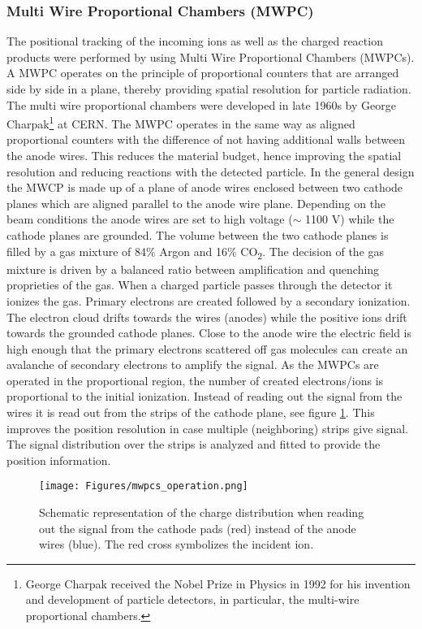 \subsubsection{Multi Wire Proportional Chambers (MWPC)}\label{sec_mwpcs}
The positional tracking of the incoming ions as well as the charged reaction products were performed by using Multi Wire Proportional Chambers (MWPCs). A MWPC operates on the principle of proportional counters that are arranged side by side in a plane, thereby providing spatial resolution for particle radiation. The multi wire proportional chambers were developed in late 1960s by George Charpak\footnote{George Charpak received the Nobel Prize in Physics in 1992 for his invention and development of particle detectors, in particular, the multi-wire proportional chambers.} at CERN\cite{charpak1968use}.\newline
The MWPC operates in the same way as aligned proportional counters with the difference of not having additional walls between the anode wires. This reduces the material budget, hence improving the spatial resolution and reducing reactions with the detected particle.\newline
In the general design the  MWCP is made up of a plane of anode wires enclosed between two cathode planes which are aligned parallel to the anode wire plane. Depending on the beam conditions the anode wires are set to high voltage ($\sim$ 1100 V) while the cathode planes are grounded.\newline
The volume between the two cathode planes is filled by a gas mixture of 84\% Argon and 16\% CO\textsubscript{2}. The decision of the gas mixture is driven by a balanced ratio between amplification and quenching proprieties of the gas.\newline
When a charged particle passes through the detector it ionizes the gas. Primary electrons are created followed by a secondary ionization. The electron cloud drifts towards the wires (anodes) while the positive ions drift towards the grounded cathode planes. Close to the anode wire the electric field is high enough that the primary electrons scattered off gas molecules can create an avalanche of secondary electrons to amplify the signal. As the MWPCs are operated in the proportional region, the number of created electrons/ions is proportional to the initial ionization. Instead of reading out the signal from the wires it is read out from the strips of the cathode plane, see figure \ref{fig:mwpcs_operation}. This improves the position resolution in case multiple (neighboring) strips give signal. The signal distribution over the strips is analyzed and fitted to provide the position information.\newline
\begin{figure}[htpb]
    \centering
    \texttt{[image: Figures/mwpcs\_operation.png]}
    \caption{
    Schematic representation of the charge distribution when reading out the signal from the cathode pads (red) instead of the anode wires (blue). The red cross symbolizes the incident ion.
    } 
    \label{fig:mwpcs_operation}
\end{figure}

